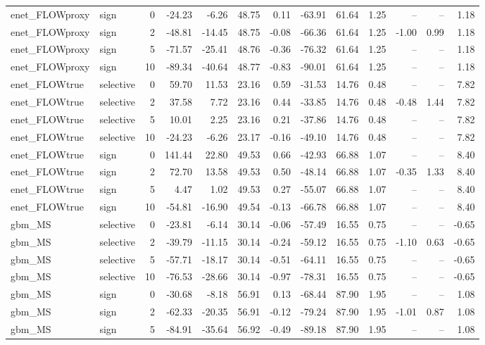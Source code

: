 \begin{tabular}{llrrrrrrrrrrr}
enet_FLOWproxy & sign & 0 & -24.23 & -6.26 & 48.75 & 0.11 & -63.91 & 61.64 & 1.25 & -- & -- & 1.18 \\
enet_FLOWproxy & sign & 2 & -48.81 & -14.45 & 48.75 & -0.08 & -66.36 & 61.64 & 1.25 & -1.00 & 0.99 & 1.18 \\
enet_FLOWproxy & sign & 5 & -71.57 & -25.41 & 48.76 & -0.36 & -76.32 & 61.64 & 1.25 & -- & -- & 1.18 \\
enet_FLOWproxy & sign & 10 & -89.34 & -40.64 & 48.77 & -0.83 & -90.01 & 61.64 & 1.25 & -- & -- & 1.18 \\
enet_FLOWtrue & selective & 0 & 59.70 & 11.53 & 23.16 & 0.59 & -31.53 & 14.76 & 0.48 & -- & -- & 7.82 \\
enet_FLOWtrue & selective & 2 & 37.58 & 7.72 & 23.16 & 0.44 & -33.85 & 14.76 & 0.48 & -0.48 & 1.44 & 7.82 \\
enet_FLOWtrue & selective & 5 & 10.01 & 2.25 & 23.16 & 0.21 & -37.86 & 14.76 & 0.48 & -- & -- & 7.82 \\
enet_FLOWtrue & selective & 10 & -24.23 & -6.26 & 23.17 & -0.16 & -49.10 & 14.76 & 0.48 & -- & -- & 7.82 \\
enet_FLOWtrue & sign & 0 & 141.44 & 22.80 & 49.53 & 0.66 & -42.93 & 66.88 & 1.07 & -- & -- & 8.40 \\
enet_FLOWtrue & sign & 2 & 72.70 & 13.58 & 49.53 & 0.50 & -48.14 & 66.88 & 1.07 & -0.35 & 1.33 & 8.40 \\
enet_FLOWtrue & sign & 5 & 4.47 & 1.02 & 49.53 & 0.27 & -55.07 & 66.88 & 1.07 & -- & -- & 8.40 \\
enet_FLOWtrue & sign & 10 & -54.81 & -16.90 & 49.54 & -0.13 & -66.78 & 66.88 & 1.07 & -- & -- & 8.40 \\
gbm_MS & selective & 0 & -23.81 & -6.14 & 30.14 & -0.06 & -57.49 & 16.55 & 0.75 & -- & -- & -0.65 \\
gbm_MS & selective & 2 & -39.79 & -11.15 & 30.14 & -0.24 & -59.12 & 16.55 & 0.75 & -1.10 & 0.63 & -0.65 \\
gbm_MS & selective & 5 & -57.71 & -18.17 & 30.14 & -0.51 & -64.11 & 16.55 & 0.75 & -- & -- & -0.65 \\
gbm_MS & selective & 10 & -76.53 & -28.66 & 30.14 & -0.97 & -78.31 & 16.55 & 0.75 & -- & -- & -0.65 \\
gbm_MS & sign & 0 & -30.68 & -8.18 & 56.91 & 0.13 & -68.44 & 87.90 & 1.95 & -- & -- & 1.08 \\
gbm_MS & sign & 2 & -62.33 & -20.35 & 56.91 & -0.12 & -79.24 & 87.90 & 1.95 & -1.01 & 0.87 & 1.08 \\
gbm_MS & sign & 5 & -84.91 & -35.64 & 56.92 & -0.49 & -89.18 & 87.90 & 1.95 & -- & -- & 1.08 \\

\end{tabular}
